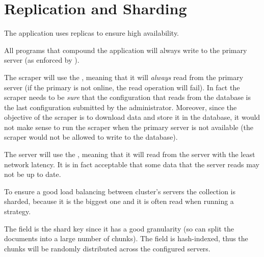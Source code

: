 \section{Replication and Sharding}\label{sec:distributed}

The application uses replicas to ensure high availability.

All programs that compound the application will always write to the primary
server (as enforced by \mongodb).

The scraper will use the  ,
meaning that it will \emph{always} read from the primary server (if the primary
is not online, the read operation will fail). In fact the scraper needs to be
\emph{sure} that the configuration that reads from the database is the last
configuration submitted by the administrator. Moreover, since the objective of
the scraper is to download data and store it in the database, it would not make
sense to run the scraper when the primary server is not available (the scraper
would not be allowed to write to the database).

The server will use the  ,
meaning that it will read from the server with the least network latency. It is
in fact acceptable that some data that the server reads may not be up to date.

To ensure a good load balancing between cluster's servers the 
collection is sharded, because it is the biggest one and it is often read when
running a strategy.

The  field is the shard key since it has a good granularity (so
\mongodb{} can split the documents into a large number of chunks). The field is
hash-indexed, thus the chunks will be randomly distributed across the configured
servers.
